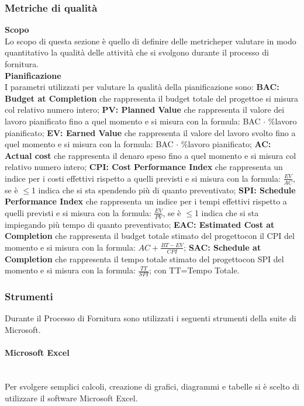 \subsubsection{Metriche di qualità}
\textbf{Scopo}\\
Lo scopo di questa sezione è quello di definire delle metriche\glosp per valutare in modo quantitativo la qualità delle attività che si svolgono durante il processo di fornitura.
\\\textbf{Pianificazione}\\
I parametri utilizzati per valutare la qualità della pianificazione sono:
\textbf{BAC: Budget at Completion} che rappresenta il budget totale del progetto\glosp e si misura col relativo numero intero;
\textbf{PV: Planned Value} che rappresenta il valore dei lavoro pianificato fino a quel momento e si misura con la formula: BAC $\cdot$ \%lavoro pianificato;
\textbf{EV: Earned Value} che rappresenta il valore del lavoro svolto fino a quel momento e si misura con la formula: BAC $\cdot$ \%lavoro pianificato;
\textbf{AC: Actual cost} che rappresenta il denaro speso fino a quel momento e si misura col relativo numero intero;
\textbf{CPI: Cost Performance Index} che rappresenta un indice per i costi effettivi rispetto a quelli previsti e si misura con la formula: $\frac{EV}{AC}$, se è $\le$1 indica che si sta spendendo più di quanto preventivato;
\textbf{SPI: Schedule Performance Index} che rappresenta un indice per i tempi effettivi rispetto a quelli previsti e si misura con la formula: $\frac{EV}{PV}$, se è $\le$1 indica che si sta impiegando più tempo di quanto preventivato;
\textbf{EAC: Estimated Cost at Completion} che rappresenta il budget totale stimato del progetto\glosp con il CPI del momento e si misura con la formula: $AC+\frac{BT-EV}{CPI}$;
\textbf{SAC: Schedule at Completion} che rappresenta il tempo totale stimato del progetto\glosp con SPI del momento e si misura con la formula: $\frac{TT}{SPI}$; con TT=Tempo Totale.
\subsubsection{Strumenti}
Durante il Processo di Fornitura sono utilizzati i seguenti strumenti della suite di Microsoft.
\paragraph{Microsoft Excel}\mbox{}\\ [1mm]
Per svolgere semplici calcoli, creazione di grafici, diagrammi e tabelle si è scelto di utilizzare il software Microsoft Excel.
